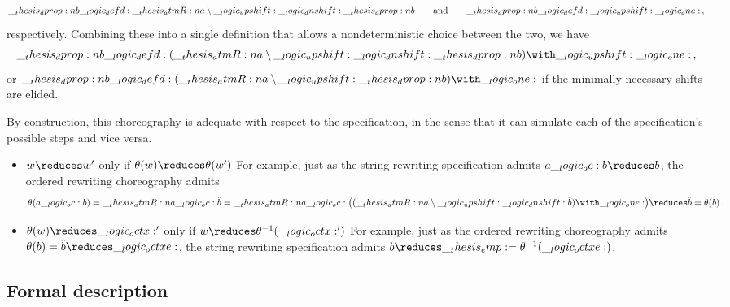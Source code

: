 \begin{equation*}
  \__thesis_dprop:n {b} \__logic_defd: \__thesis_atmR:n {a} \mathbin { \setminus } \__logic_upshift: \__logic_dnshift: \__thesis_dprop:n {b}
  \qquad\text{and}\qquad
  \__thesis_dprop:n {b} \__logic_defd: \__logic_upshift: \__logic_one:
  \,,
\end{equation*}
respectively.
Combining these into a single definition that allows a nondeterministic choice between the two, we have
\begin{equation*}
  \dprop{b} \defd (\atmR{a} \limp \up \dn \dprop{b}) \with \up \one
  \,,
\end{equation*}
or $\dprop{b} \defd (\atmR{a} \limp \up \dprop{b}) \with \one$ if the minimally necessary shifts are elided.

By construction, this choreography is adequate with respect to the specification, in the sense that it can simulate each of the specification's possible steps and vice versa.
\begin{itemize}
\item $w \reduces w'$ only if $\theta(w) \reduces \theta(w')$
  For example, just as the string rewriting specification admits $a \oc b \reduces b$, the ordered rewriting choreography admits
  \begin{equation*}
    \theta(a \oc b) = \atmR{a} \oc \defp{b} = \atmR{a} \oc \bigl((\atmR{a} \limp \up \dn \defp{b}) \with \one\bigr) \reduces \defp{b} = \theta(b)
    \,.
  \end{equation*}

\item $\theta(w) \reduces \octx'$ only if $w \reduces \theta^{-1}(\octx')$
  For example, just as the ordered rewriting choreography admits $\theta(b) = \defp{b} \reduces \octxe$, the string rewriting specification admits $b \reduces \emp = \theta^{-1}(\octxe)$.
\end{itemize}

\subsection{Formal description}

